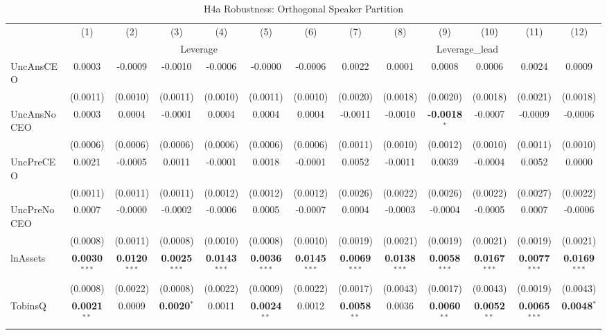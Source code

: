 \begin{landscape}
\begin{table}[H]
\setlength{\tabcolsep}{3pt}
\renewcommand{\arraystretch}{0.85}
\centering
\caption{H4a Robustness: Orthogonal Speaker Partition}
\label{tab:h4a_robust}
\scriptsize
\begin{tabular}{lcccccccccccc}
\toprule
 & (1) & (2) & (3) & (4) & (5) & (6) & (7) & (8) & (9) & (10) & (11) & (12) \\
 & \multicolumn{6}{c}{Leverage} & \multicolumn{6}{c}{Leverage\_lead} \\
\cmidrule(lr){2-7} \cmidrule(lr){8-13}
\midrule
UncAnsCEO & 0.0003 & -0.0009 & -0.0010 & -0.0006 & -0.0000 & -0.0006 & 0.0022 & 0.0001 & 0.0008 & 0.0006 & 0.0024 & 0.0009 \\
 & (0.0011) & (0.0010) & (0.0011) & (0.0010) & (0.0011) & (0.0010) & (0.0020) & (0.0018) & (0.0020) & (0.0018) & (0.0021) & (0.0018) \\
UncAnsNoCEO & 0.0003 & 0.0004 & -0.0001 & 0.0004 & 0.0004 & 0.0004 & -0.0011 & -0.0010 & \textbf{-0.0018}$^{*}$ & -0.0007 & -0.0009 & -0.0006 \\
 & (0.0006) & (0.0006) & (0.0006) & (0.0006) & (0.0006) & (0.0006) & (0.0011) & (0.0010) & (0.0012) & (0.0010) & (0.0011) & (0.0010) \\
UncPreCEO & 0.0021 & -0.0005 & 0.0011 & -0.0001 & 0.0018 & -0.0001 & 0.0052 & -0.0011 & 0.0039 & -0.0004 & 0.0052 & 0.0000 \\
 & (0.0011) & (0.0011) & (0.0011) & (0.0012) & (0.0012) & (0.0012) & (0.0026) & (0.0022) & (0.0026) & (0.0022) & (0.0027) & (0.0022) \\
UncPreNoCEO & 0.0007 & -0.0000 & -0.0002 & -0.0006 & 0.0005 & -0.0007 & 0.0004 & -0.0003 & -0.0004 & -0.0005 & 0.0007 & -0.0006 \\
 & (0.0008) & (0.0011) & (0.0008) & (0.0010) & (0.0008) & (0.0010) & (0.0019) & (0.0021) & (0.0019) & (0.0021) & (0.0019) & (0.0021) \\
\midrule
lnAssets & \textbf{0.0030}$^{***}$ & \textbf{0.0120}$^{***}$ & \textbf{0.0025}$^{***}$ & \textbf{0.0143}$^{***}$ & \textbf{0.0036}$^{***}$ & \textbf{0.0145}$^{***}$ & \textbf{0.0069}$^{***}$ & \textbf{0.0138}$^{***}$ & \textbf{0.0058}$^{***}$ & \textbf{0.0167}$^{***}$ & \textbf{0.0077}$^{***}$ & \textbf{0.0169}$^{***}$ \\
 & (0.0008) & (0.0022) & (0.0008) & (0.0022) & (0.0009) & (0.0022) & (0.0017) & (0.0043) & (0.0017) & (0.0043) & (0.0019) & (0.0043) \\
TobinsQ & \textbf{0.0021}$^{**}$ & 0.0009 & \textbf{0.0020}$^{*}$ & 0.0011 & \textbf{0.0024}$^{**}$ & 0.0012 & \textbf{0.0058}$^{**}$ & 0.0036 & \textbf{0.0060}$^{**}$ & \textbf{0.0052}$^{**}$ & \textbf{0.0065}$^{***}$ & \textbf{0.0048}$^{*}$ \\

\end{tabular}
\end{table}
\end{landscape}
